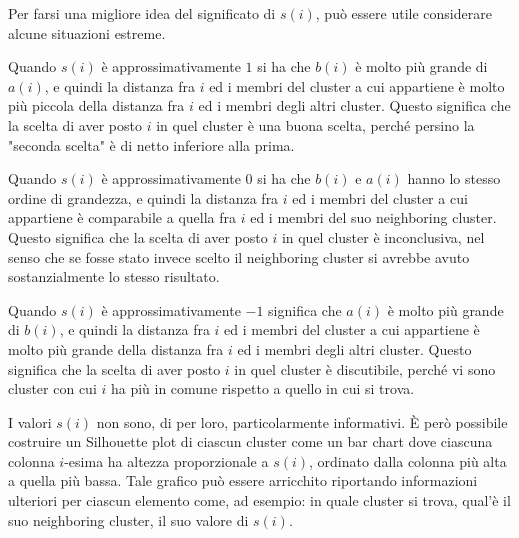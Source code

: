 \documentclass[12pt]{report}
\begin{document}
			Per farsi una migliore idea del significato di $s(i)$, può essere
			utile considerare alcune situazioni estreme.

			Quando $s(i)$ è approssimativamente $1$ si ha che $b(i)$ è molto
			più grande di $a(i)$, e quindi la distanza fra $i$ ed i membri del
			cluster a cui appartiene è molto più piccola della distanza fra $i$
			ed i membri degli altri cluster. Questo significa che la scelta di
			aver posto $i$ in quel cluster è una buona scelta, perché persino
			la "seconda scelta" è di netto inferiore alla prima.

			Quando $s(i)$ è approssimativamente $0$ si ha che $b(i)$ e $a(i)$
			hanno lo stesso ordine di grandezza, e quindi la distanza fra $i$
			ed i membri del cluster a cui appartiene è comparabile a quella
			fra $i$ ed i membri del suo neighboring cluster. Questo significa
			che la scelta di aver posto $i$ in quel cluster è inconclusiva,
			nel senso che se fosse stato invece scelto il neighboring cluster
			si avrebbe avuto sostanzialmente lo stesso risultato.

			Quando $s(i)$ è approssimativamente $-1$ significa che $a(i)$ è molto
			più grande di $b(i)$, e quindi la distanza fra $i$ ed i membri del
			cluster a cui appartiene è molto più grande della distanza fra $i$
			ed i membri degli altri cluster. Questo significa che la scelta di
			aver posto $i$ in quel cluster è discutibile, perché vi sono cluster
			con cui $i$ ha più in comune rispetto a quello in cui si trova.


			I valori $s(i)$ non sono, di per loro, particolarmente informativi.
			È però possibile costruire un Silhouette plot di ciascun cluster
			come un bar chart dove ciascuna colonna $i$-esima ha altezza
			proporzionale a $s(i)$, ordinato dalla colonna più alta a quella
			più bassa. Tale grafico può essere arricchito riportando informazioni
			ulteriori per ciascun elemento come, ad esempio: in quale cluster si
			trova, qual'è il suo neighboring cluster, il suo valore di $s(i)$.
\end{document}
